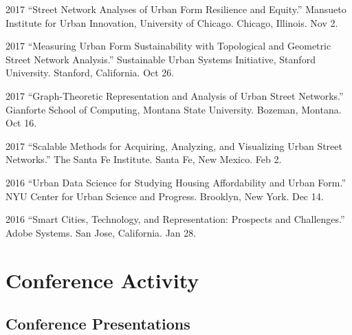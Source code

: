 \documentclass{academiccv}
\begin{document}
\begin{tablist}

\item[2017] \tab \enquote{Street Network Analyses of Urban Form Resilience and Equity.} Mansueto Institute for Urban Innovation, University of Chicago. Chicago, Illinois. Nov 2.

\item[2017] \tab \enquote{Measuring Urban Form Sustainability with Topological and Geometric Street Network Analysis.} Sustainable Urban Systems Initiative, Stanford University. Stanford, California. Oct 26.

\item[2017] \tab \enquote{Graph-Theoretic Representation and Analysis of Urban Street Networks.} Gianforte School of Computing, Montana State University. Bozeman, Montana. Oct 16.

\item[2017] \tab \enquote{Scalable Methods for Acquiring, Analyzing, and Visualizing Urban Street Networks.} The Santa Fe Institute. Santa Fe, New Mexico. Feb 2.

\item[2016] \tab \enquote{Urban Data Science for Studying Housing Affordability and Urban Form.} NYU Center for Urban Science and Progress. Brooklyn, New York. Dec 14.

\item[2016] \tab \enquote{Smart Cities, Technology, and Representation: Prospects and Challenges.} Adobe Systems. San Jose, California. Jan 28.

\end{tablist}



\section*{Conference Activity}

\subsection*{Conference Presentations}
\end{document}
